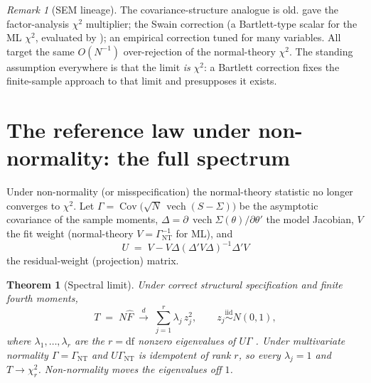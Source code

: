 \documentclass[11pt]{article}
\newcommand{\Cov}{\operatorname{Cov}}
\newcommand{\vech}{\operatorname{vech}}
\newcommand{\Gnt}{\Gamma_{\mathrm{NT}}}
\theoremstyle{plain}
\newtheorem{theorem}{Theorem}
\theoremstyle{remark}
\newtheorem*{remark}{Remark}
\begin{document}
\begin{remark}[SEM lineage]
The covariance-structure analogue is old. \cite{bartlett1950} gave the
factor-analysis $\chi^2$ multiplier; \cite{swain1975} the Swain correction (a
Bartlett-type scalar for the ML $\chi^2$, evaluated by \cite{nevitthancock2004,
herzogboomsmareinecke2007}); \cite{yuantianyanagihara2015} an empirical
correction tuned for many variables. All target the same $O(N^{-1})$
over-rejection of the normal-theory $\chi^2$. The standing assumption everywhere
is that the limit \emph{is} $\chi^2$: a Bartlett correction fixes the
finite-sample approach to that limit and presupposes it exists.
\end{remark}

\section{The reference law under non-normality: the full spectrum}
\label{sec:spectrum}

Under non-normality (or misspecification) the normal-theory statistic no longer
converges to $\chi^2$. Let $\Gamma = \Cov\!\big(\sqrt{N}\,\vech(S - \Sigma)\big)$
be the asymptotic covariance of the sample moments, $\Delta = \partial\,
\vech\Sigma(\theta)/\partial\theta'$ the model Jacobian, $V$ the fit weight
(normal-theory $V = \Gnt^{-1}$ for ML), and
%
\begin{equation}
\label{eq:U}
U \;=\; V - V\Delta(\Delta'V\Delta)^{-1}\Delta'V
\end{equation}
%
the residual-weight (projection) matrix.

\begin{theorem}[Spectral limit]
\label{thm:spectrum}
Under correct structural specification and finite fourth moments,
%
\begin{equation}
\label{eq:mixture}
T \;=\; N\hat F \;\xrightarrow{d}\; \sum_{j=1}^{r} \lambda_j\, z_j^2,
\qquad z_j \stackrel{\text{iid}}{\sim} N(0,1),
\end{equation}
%
where $\lambda_1,\dots,\lambda_r$ are the $r = \mathrm{df}$ nonzero eigenvalues of
$U\Gamma$ \cite{shapiro1983,satorra1989,satorrabentler1994}. Under multivariate
normality $\Gamma = \Gnt$ and $U\Gnt$ is idempotent of rank $r$, so every
$\lambda_j = 1$ and $T \to \chi^2_r$. Non-normality moves the eigenvalues off $1$.
\end{theorem}
\end{document}
